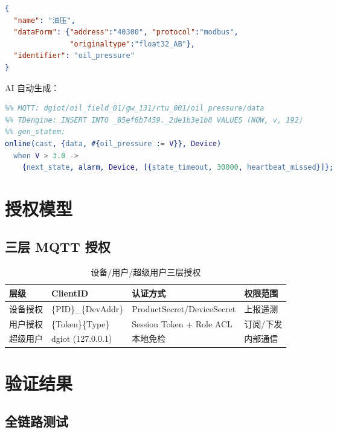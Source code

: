 \documentclass[12pt,a4paper]{ctexart}
\begin{document}
\begin{lstlisting}[language=json, caption=thing\_model.json 片段]
{
  "name": "油压",
  "dataForm": {"address":"40300", "protocol":"modbus",
               "originaltype":"float32_AB"},
  "identifier": "oil_pressure"
}
\end{lstlisting}

AI 自动生成：

\begin{lstlisting}[language=erlang]
%% Modbus: readHoldingRegisters(40300, 2, float32_AB)
%% MQTT: dgiot/oil_field_01/gw_131/rtu_001/oil_pressure/data
%% TDengine: INSERT INTO _85ef6b7459._2de1b3e1b8 VALUES (NOW, v, 192)
%% gen_statem:
online(cast, {data, #{oil_pressure := V}}, Device)
  when V > 3.0 ->
    {next_state, alarm, Device, [{state_timeout, 30000, heartbeat_missed}]};
\end{lstlisting}

\section{授权模型}

\subsection{三层 MQTT 授权}

\begin{table}[H]\centering
\caption{设备/用户/超级用户三层授权}
\begin{tabular}{p{3cm} p{3cm} p{4cm} p{3cm}}
\toprule
\textbf{层级} & \textbf{ClientID} & \textbf{认证方式} & \textbf{权限范围} \\
\midrule
设备授权 & \{PID\}\_\{DevAddr\} & ProductSecret/DeviceSecret & 上报遥测 \\
用户授权 & \{Token\}\{Type\} & Session Token + Role ACL & 订阅/下发 \\
超级用户 & dgiot (127.0.0.1) & 本地免检 & 内部通信 \\
\bottomrule
\end{tabular}
\end{table}

\section{验证结果}

\subsection{全链路测试}
\end{document}
